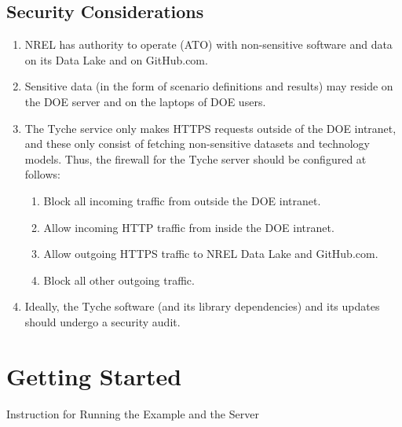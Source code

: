 \documentclass[letterpaper,10pt,english]{sphinxmanual}
\begin{document}
\section{Security Considerations}
\label{\detokenize{deployment:security-considerations}}\begin{enumerate}
\def\theenumi{\arabic{enumi}}
\def\labelenumi{\theenumi .}
\makeatletter\def\p@enumii{\p@enumi \theenumi .}\makeatother
\item {} 
NREL has authority to operate (ATO) with non-sensitive software and
data on its Data Lake and on GitHub.com.

\item {} 
Sensitive data (in the form of scenario definitions and results) may
reside on the DOE server and on the laptops of DOE users.

\item {} 
The Tyche service only makes HTTPS  requests outside of the
DOE intranet, and these only consist of fetching non-sensitive
datasets and technology models. Thus, the firewall for the Tyche
server should be configured at follows:
\begin{enumerate}
\def\theenumii{\arabic{enumii}}
\def\labelenumii{\theenumii .}
\makeatletter\def\p@enumiii{\p@enumii \theenumii .}\makeatother
\item {} 
Block all incoming traffic from outside the DOE intranet.

\item {} 
Allow incoming HTTP traffic from inside the DOE intranet.

\item {} 
Allow outgoing HTTPS traffic to NREL Data Lake and GitHub.com.

\item {} 
Block all other outgoing traffic.

\end{enumerate}

\item {} 
Ideally, the Tyche software (and its library dependencies) and its
updates should undergo a security audit.

\end{enumerate}


\chapter{Getting Started}
\label{\detokenize{getting-started:getting-started}}\label{\detokenize{getting-started::doc}}
Instruction for Running the Example and the Server
\end{document}
